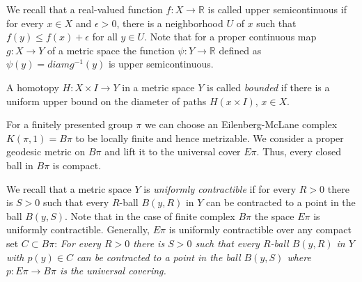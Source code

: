 \documentclass[12pt]{amsart}
\theoremstyle{plain}
\theoremstyle{definition}
\begin{document}
We recall that a real-valued function $f:X\to\mathbb R$ is called upper semicontinuous if for every $x\in X$ and $\epsilon>0$,
there is a neighborhood $U$ of $x$ such that $f(y)\le f(x)+\epsilon$ for all $y\in U$. Note that for a proper continuous map 
$g:X\to Y$ of a metric space the function $\psi:Y\to\mathbb R$ defined as $\psi(y)=diam g^{-1}(y)$ is upper semicontinuous.

A homotopy $H:X\times I\to Y$  in a metric space $Y$ is called {\em bounded} if there is a uniform upper bound on the diameter
of paths $H(x\times I)$, $x\in X$.

For a finitely presented group $\pi$ we can choose an Eilenberg-McLane complex $K(\pi,1)=B\pi$ to be locally finite and hence metrizable. We consider a proper geodesic metric on $B\pi$ and lift it to the universal cover $E\pi$. Thus, every closed ball in $B\pi$ is compact.

We recall that a metric space $Y$ is {\em uniformly contractible} if for every $R>0$ there is $S>0$ such that every $R$-ball $B(y,R)$ in $Y$
can be contracted to a point in the ball $B(y,S)$. Note that in the case of finite complex $B\pi$ the space $E\pi$ is uniformly contractible.
Generally, $E\pi$ is uniformly contractible over any compact set $C\subset B\pi$: {\em For every $R>0$ there is $S>0$ such that every $R$-ball $B(y,R)$ in $Y$
with $p(y)\in C$ can be contracted to a point in the ball $B(y,S)$ where $p:E\pi\to B\pi$ is the universal covering. }
\end{document}
